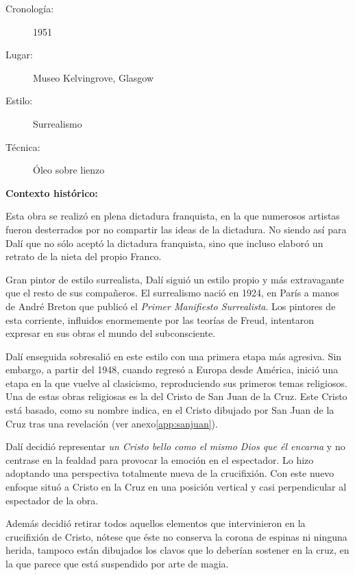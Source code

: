 
\begin{description}
\item[Cronología:] 1951
\item[Lugar:] Museo Kelvingrove, Glasgow
\item[Estilo:] Surrealismo
\item[Técnica:] Óleo sobre lienzo
\end{description}

\textbf{Contexto histórico:}

Esta obra se realizó en plena dictadura franquista, en la que numerosos artistas fueron desterrados por no compartir las ideas de la dictadura. No siendo así para Dalí que no sólo aceptó la dictadura franquista, sino que incluso elaboró un retrato de la nieta del propio Franco.

Gran pintor de estilo surrealista, Dalí siguió un estilo propio y más extravagante que el resto de sus compañeros. El surrealismo nació en 1924, en París a manos de André Breton que publicó el \textit{Primer Manifiesto Surrealista}. Los pintores de esta corriente, influidos enormemente por las teorías de Freud, intentaron expresar en sus obras el mundo del subconsciente.

Dalí enseguida sobresalió en este estilo con una primera etapa más agresiva. Sin embargo, a partir del 1948, cuando regresó a Europa desde América, inició una etapa en la que vuelve al clasicismo, reproduciendo sus primeros temas religiosos. Una de estas obras religiosas es la del Cristo de San Juan de la Cruz. Este Cristo está basado, como su nombre indica, en el Cristo dibujado por San Juan de la Cruz tras una revelación (ver anexo\autoref{app:sanjuan}).

Dalí decidió representar \textit{un Cristo bello como el mismo Dios que él encarna} y no centrase en la fealdad para provocar la emoción en el espectador. Lo hizo adoptando una perspectiva totalmente nueva de la crucifixión. Con este nuevo enfoque situó a Cristo en la Cruz en una posición vertical y casi perpendicular al espectador de la obra.

Además decidió retirar todos aquellos elementos que intervinieron en la crucifixión de Cristo, nótese que éste no conserva la corona de espinas ni ninguna herida, tampoco están dibujados los clavos que lo deberían sostener en la cruz, en la que parece que está suspendido por arte de magia.

